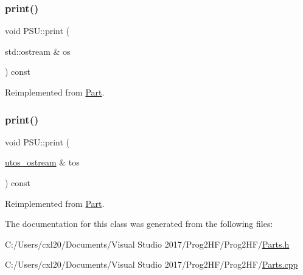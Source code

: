 \subsubsection{\texorpdfstring{print()}{print()}\hspace{0.1cm}{\footnotesize\ttfamily [1/2]}}
{\footnotesize\ttfamily void P\+S\+U\+::print (\begin{DoxyParamCaption}\item[{std\+::ostream \&}]{os }\end{DoxyParamCaption}) const\hspace{0.3cm}{\ttfamily [virtual]}}



Reimplemented from \mbox{\hyperlink{class_part_a4fa402b8e8fd4236ff773a7697ab2bc3}{Part}}.

\mbox{\label{class_p_s_u_a81c74aa3a327003c58b89ca2b8602c1d}} 
\subsubsection{\texorpdfstring{print()}{print()}\hspace{0.1cm}{\footnotesize\ttfamily [2/2]}}
{\footnotesize\ttfamily void P\+S\+U\+::print (\begin{DoxyParamCaption}\item[{\mbox{\hyperlink{structutos__ostream}{utos\+\_\+ostream}} \&}]{tos }\end{DoxyParamCaption}) const\hspace{0.3cm}{\ttfamily [virtual]}}



Reimplemented from \mbox{\hyperlink{class_part_a9ecabe44ba3415badf82c6a23617a41e}{Part}}.



The documentation for this class was generated from the following files\+:\begin{DoxyCompactItemize}
\item 
C\+:/\+Users/cxl20/\+Documents/\+Visual Studio 2017/\+Prog2\+H\+F/\+Prog2\+H\+F/\mbox{\hyperlink{_parts_8h}{Parts.\+h}}\item 
C\+:/\+Users/cxl20/\+Documents/\+Visual Studio 2017/\+Prog2\+H\+F/\+Prog2\+H\+F/\mbox{\hyperlink{_parts_8cpp}{Parts.\+cpp}}\end{DoxyCompactItemize}
